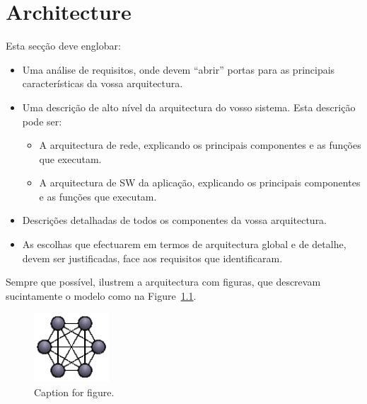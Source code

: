 \chapter{Architecture}
\label{chapter:architecture}
Esta secção deve englobar:

\begin{itemize}
    \item Uma análise de requisitos, onde devem “abrir” portas para as principais
        características da vossa arquitectura.
    \item Uma descrição de alto nível da arquitectura do vosso sistema. Esta descrição
        pode ser:
        \begin{itemize}
            \item A arquitectura de rede, explicando os principais componentes e as
                funções que executam.
            \item A arquitectura de SW da aplicação, explicando os principais
                componentes e as funções que executam.
        \end{itemize}
    \item Descrições detalhadas de todos os componentes da vossa arquitectura.
    \item As escolhas que efectuarem em termos de arquitectura global e de detalhe,
        devem ser justificadas, face aos requisitos que identificaram.
\end{itemize}

Sempre que possível, ilustrem a arquitectura com figuras, que descrevam
sucintamente o modelo como na Figure~\ref{fig:logoCNM}.

\begin{figure}[!htb]
  \centering
  \includegraphics[width=0.25\textwidth]{Figures/logoCNM.png}
  \caption[Caption for figure in TOC]{Caption for figure.}
  \label{fig:logoCNM}
\end{figure}
